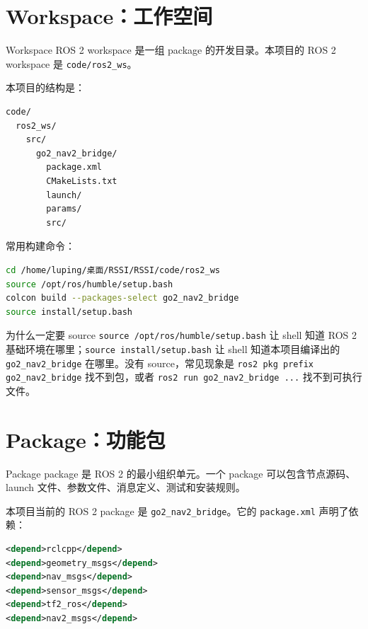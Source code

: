 \documentclass[UTF8,11pt,a4paper,openany]{ctexrep}
\newcommand{\code}[1]{\nolinkurl{#1}}
\newcommand{\file}[1]{\nolinkurl{#1}}
\newcommand{\pkg}[1]{\nolinkurl{#1}}
\begin{document}
\section{Workspace：工作空间}

\begin{termdef}{Workspace}
ROS 2 workspace 是一组 package 的开发目录。本项目的 ROS 2 workspace 是 \file{code/ros2_ws}。
\end{termdef}

本项目的结构是：

\begin{lstlisting}[language=bash]
code/
  ros2_ws/
    src/
      go2_nav2_bridge/
        package.xml
        CMakeLists.txt
        launch/
        params/
        src/
\end{lstlisting}

常用构建命令：

\begin{lstlisting}[language=bash]
cd /home/luping/桌面/RSSI/RSSI/code/ros2_ws
source /opt/ros/humble/setup.bash
colcon build --packages-select go2_nav2_bridge
source install/setup.bash
\end{lstlisting}

\begin{warnbox}{为什么一定要 source}
\code{source /opt/ros/humble/setup.bash} 让 shell 知道 ROS 2 基础环境在哪里；\code{source install/setup.bash} 让 shell 知道本项目编译出的 \pkg{go2_nav2_bridge} 在哪里。没有 source，常见现象是 \code{ros2 pkg prefix go2_nav2_bridge} 找不到包，或者 \code{ros2 run go2_nav2_bridge ...} 找不到可执行文件。
\end{warnbox}

\section{Package：功能包}

\begin{termdef}{Package}
package 是 ROS 2 的最小组织单元。一个 package 可以包含节点源码、launch 文件、参数文件、消息定义、测试和安装规则。
\end{termdef}

本项目当前的 ROS 2 package 是 \pkg{go2_nav2_bridge}。它的 \file{package.xml} 声明了依赖：

\begin{lstlisting}[language=xml]
<depend>rclcpp</depend>
<depend>geometry_msgs</depend>
<depend>nav_msgs</depend>
<depend>sensor_msgs</depend>
<depend>tf2_ros</depend>
<depend>nav2_msgs</depend>
\end{lstlisting}
\end{document}
